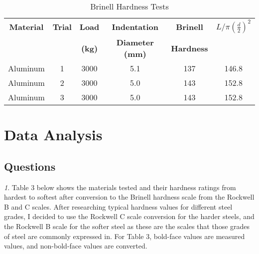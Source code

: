 \documentclass{article}
\begin{document}
\begin{table}[h]
  \begin{center}
    \caption{Brinell Hardness Tests}
    \label{tab:table2}
    \vspace{.5em}
    \begin{tabular}{c|c|c|c|c|c} 
      \textbf{Material} & \textbf{Trial} & \textbf{Load} &
      \textbf{Indentation} & \textbf{Brinell} & $L/\pi(\frac{d}{2})^2$\\
      & & \textbf{(\si{kg})} & \textbf{Diameter (\si{mm})} & \textbf{Hardness} & \\
      \hline
      Aluminum & 1 & 3000 & 5.1 & 137 & 146.8\\
      Aluminum & 2 & 3000 & 5.0 & 143 & 152.8\\
      Aluminum & 3 & 3000 & 5.0 & 143 & 152.8\\
      \hline
      
    \end{tabular}
  \end{center}
\end{table}

\section{Data Analysis}
\subsection{Questions}
\textit{1}. Table 3 below shows the materials tested and their hardness ratings from hardest to softest after conversion to the Brinell hardness scale from the Rockwell B and C scales. After researching typical hardness values for different steel grades, I decided to use the Rockwell C scale conversion for the harder steels, and the Rockwell B scale for the softer steel as these are the scales that those grades of steel are commonly expressed in. For Table 3, bold-face values are measured values, and non-bold-face values are converted.
\end{document}
